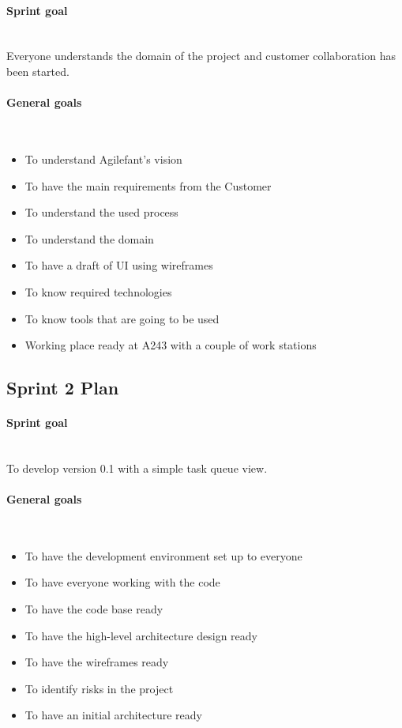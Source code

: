 \paragraph{Sprint goal}~\\
Everyone understands the domain of the project and customer collaboration has
been started. \checked

\paragraph{General goals}~
\begin{itemize}
  \item To understand Agilefant's vision \checked
  \item To have the main requirements from the Customer \checked
  \item To understand the used process \checked
  \item To understand the domain \checked
  \item To have a draft of UI using wireframes \checked
  \item To know required technologies \checked
  \item To know tools that are going to be used \checked
  \item Working place ready at A243 with a couple of work stations \checked
\end{itemize}

\subsection{Sprint 2 Plan}

\paragraph{Sprint goal}~\\
To develop version 0.1 with a simple task queue view.

\paragraph{General goals}~
\begin{itemize}
  \item To have the development environment set up to everyone \checked
  \item To have everyone working with the code \checked
  \item To have the code base ready
  \item To have the high-level architecture design ready
  \item To have the wireframes ready \checked
  \item To identify risks in the project \checked
  \item To have an initial architecture ready \checked
\end{itemize}

